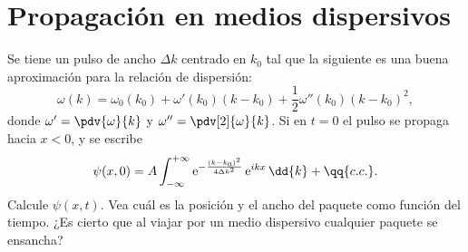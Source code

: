 \section*{Propagación en medios dispersivos}

\item Se tiene un pulso de ancho $\Delta k$ centrado en $k_0$ tal que la siguiente es una buena aproximación para la relación de dispersión:
\[
	\omega(k) = \omega_0 (k_0) + \omega'(k_0) (k - k_0) + \frac{1}{2} \omega'' (k_0) ( k - k_0 )^2,
\]
donde \(\omega'= \pdv{\omega}{k}\) y  \(\omega''= \pdv[2]{\omega}{k}\).
Si en $t=0$ el pulso se propaga hacia $x<0$, y se escribe
\[
	\psi(x,0) = A \int_{-\infty}^{+\infty} \operatorname{e}^{ - \frac{ ( k - k_0 )^2 }{ 4 \Delta k^2 } } \operatorname{e}^{ i k x } \dd{k} + \qq{c.c.}.
\]
Calcule $\psi(x,t)$.
Vea cuál es la posición y el ancho del paquete como función del tiempo.
¿Es cierto que al viajar por un medio dispersivo cualquier paquete se ensancha?
